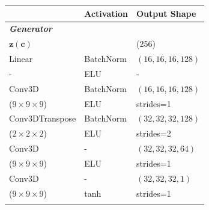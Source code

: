 \documentclass[twocolumn]{article}
\numberwithin{equation}{section}
\begin{document}
\begin{table}[h!]
\centering
\begin{tabularx}{\columnwidth}{@{}YYY@{}}%
 \hline
 & \textbf{Activation} & \textbf{Output Shape}  \\ %
 \hline\hline
 \bf{\textit{Generator}} & & \\
 \hline\hline
$\mathbf{z}(\mathbf{c})$ & &  (256) \\
 \hline
Linear & BatchNorm  & $(16, 16, 16, 128)$ \\ 
    - &  ELU & - \\ 
 \hline
 Conv3D & BatchNorm  & $(16, 16, 16, 128)$ \\ 
     ($9\times9\times9$)&  ELU  & strides=1 \\
 \hline
Conv3DTranspose & BatchNorm  & $(32, 32, 32, 128)$ \\ 
    ($2\times2\times2$)&  ELU & strides=2 \\
 \hline
Conv3D  & - & $(32, 32, 32, 64)$ \\ 
 ($9\times9\times9$)& ELU & strides=1 \\ [1ex] 
 \hline\hline
Conv3D  & - & $(32, 32, 32, 1)$ \\ 
 ($9\times9\times9$)& tanh & strides=1 \\ [1ex] 
 
 \hline
 \\
 \hline\hline
 

\end{tabularx}
\end{table}
\end{document}
